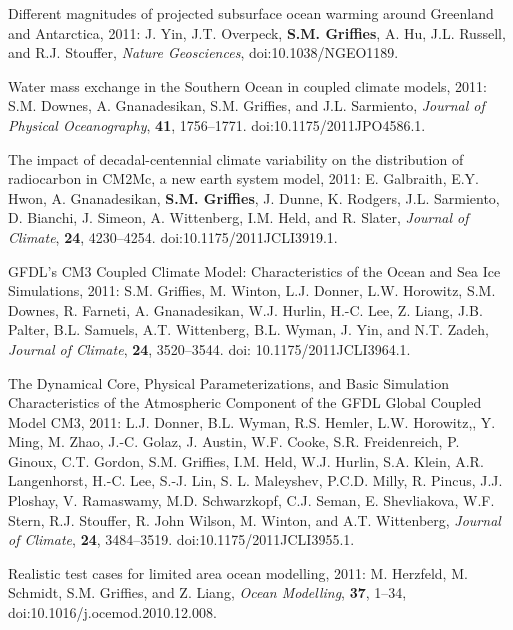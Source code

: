 \begin{etaremune}
\item Different magnitudes of projected subsurface ocean warming
  around Greenland and Antarctica, 2011: J. Yin, J.T. Overpeck, {\bf
    S.M. Grif\/f\/ies}, A. Hu, J.L. Russell, and R.J. Stouffer, {\it
    Nature Geosciences}, doi:10.1038/NGEO1189.

\item Water mass exchange in the Southern Ocean in coupled climate
  models, 2011: S.M. Downes, A. Gnanadesikan, S.M. Grif\/f\/ies,
  and J.L. Sarmiento, {\it Journal of Physical Oceanography}, {\bf
    41}, 1756--1771.  doi:10.1175/2011JPO4586.1.

\item The impact of decadal-centennial climate variability on the
  distribution of radiocarbon in CM2Mc, a new earth system model,
  2011: E. Galbraith, E.Y. Hwon, A. Gnanadesikan, {\bf
    S.M. Grif\/f\/ies}, J. Dunne, K. Rodgers, J.L. Sarmiento, D.
  Bianchi, J. Simeon, A. Wittenberg, I.M. Held, and R.  Slater, {\it
    Journal of Climate}, {\bf 24}, 4230--4254.
  doi:10.1175/2011JCLI3919.1.

\item GFDL's CM3 Coupled Climate Model: Characteristics of the Ocean
  and Sea Ice Simulations, 2011: S.M. Grif\/f\/ies, M. Winton,
  L.J. Donner, L.W. Horowitz, S.M. Downes, R.  Farneti,
  A. Gnanadesikan, W.J. Hurlin, H.-C. Lee, Z. Liang, J.B. Palter,
  B.L. Samuels, A.T. Wittenberg, B.L. Wyman, J.  Yin, and N.T. Zadeh,
  {\it Journal of Climate}, {\bf 24}, 3520--3544.  doi:
  10.1175/2011JCLI3964.1.

\item The Dynamical Core, Physical Parameterizations, and Basic Simulation Characteristics of the Atmospheric Component of the GFDL Global Coupled Model CM3, 2011: L.J. Donner, B.L. Wyman, R.S. Hemler, L.W. Horowitz,, Y. Ming, M. Zhao, J.-C. Golaz, J. Austin, W.F. Cooke, S.R. Freidenreich, P. Ginoux, C.T. Gordon, S.M. Grif\/f\/ies, I.M. Held, W.J. Hurlin, S.A. Klein, A.R. Langenhorst, H.-C. Lee, S.-J. Lin, S. L. Maleyshev, P.C.D. Milly, R. Pincus, J.J. Ploshay, V. Ramaswamy, M.D. Schwarzkopf, C.J. Seman, E. Shevliakova, W.F. Stern, R.J. Stouﬀer, R. John Wilson, M.  Winton, and A.T. Wittenberg, {\it Journal of Climate}, {\bf 24}, 3484--3519. 
  doi:10.1175/2011JCLI3955.1.

\item Realistic test cases for limited area ocean modelling, 2011: M. Herzfeld, M. Schmidt, S.M. Grif\/f\/ies, and Z. Liang, {\it    Ocean Modelling}, {\bf 37}, 1--34, doi:10.1016/j.ocemod.2010.12.008.


\end{etaremune}
